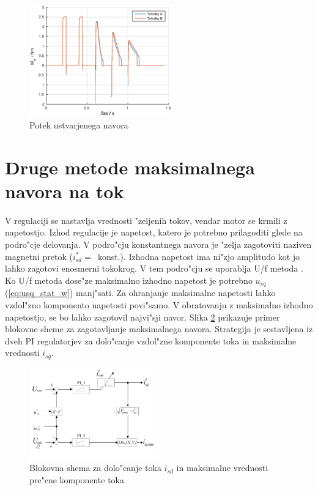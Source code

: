 \documentclass[journal,a4paper,twoside]{sty/IEEEtran}
\begin{document}
\begin{figure}
\includegraphics[width=0.55\textwidth]{fig_Mel.eps}
\caption{Potek ustvarjenega navora}
\label{fig:Mel}
\end{figure}

\section{Druge metode maksimalnega navora na tok}

V regulaciji se nastavlja vrednosti "zeljenih tokov, vendar motor se krmili z napetostjo. Izhod regulacije je napetost, katero je potrebno prilagoditi glede na  podro"cje delovanja. V podro"cju konstantnega navora je "zelja zagotoviti naziven magnetni pretok ($i_{sd}^*=$~konst.).
Izhodna napetost ima ni"zjo amplitudo kot jo lahko zagotovi enosmerni tokokrog. V tem podro"cju se uporablja U/f metoda \cite{servopogoni}. Ko U/f metoda dose"ze maksimalno izhodno napetost je potrebno $u_{sq}$ (\ref{eq:usq_stat_w}) manj"sati. Za ohranjanje maksimalne napetosti lahko vzdol"zno komponento napetosti povi"samo. V obratovanju z maksimalno izhodno napetostjo, se bo lahko zagotovil najvi"sji navor. Slika \ref{fig:MTPA_strategy} prikazuje primer blokovne sheme za zagotavljanje maksimalnega navora. Strategija je sestavljena iz dveh PI regulatorjev za dolo"canje vzdol"zne komponente toka in maksimalne vrednosti $i_{sq}$.

\begin{figure}
\includegraphics[width=0.5\textwidth]{MTPA_prva.png}
\caption{Blokovna shema za dolo"canje toka $i_{sd}$ in maksimalne vrednosti pre"cne komponente toka \cite{MTPA}}
\label{fig:MTPA_strategy}
\end{figure}
\end{document}
